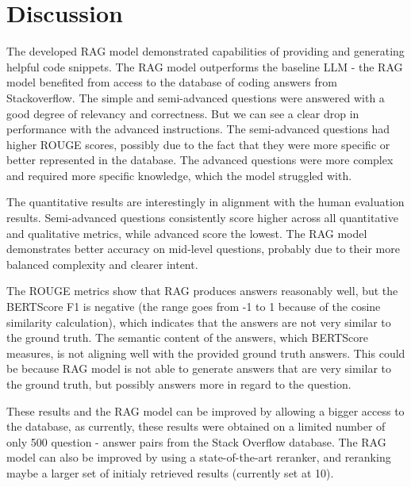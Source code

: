 \documentclass[fleqn,moreauthors,10pt]{ds_report}
\begin{document}
\section*{Discussion}
The developed RAG model demonstrated capabilities of providing and generating helpful code snippets. The RAG model outperforms the baseline LLM - the RAG model benefited from access to the database of coding answers from Stackoverflow. The simple and semi-advanced questions were answered with a good degree of relevancy and correctness. But we can see a clear drop in performance with the advanced instructions. The semi-advanced questions had higher ROUGE scores, possibly due to the fact that they were more specific or better represented in the database. The advanced questions were more complex and required more specific knowledge, which the model struggled with. 

The quantitative results are interestingly in alignment with the human evaluation results. Semi-advanced questions consistently score higher across all quantitative and qualitative metrics, while advanced score the lowest. The RAG model demonstrates better accuracy on mid-level questions, probably due to their more balanced complexity and clearer intent.

The ROUGE metrics show that RAG produces answers reasonably well, but the BERTScore F1 is negative (the range goes from -1 to 1 because of the cosine similarity calculation), which indicates that the answers are not very similar to the ground truth. The semantic content of the answers, which BERTScore measures, is not aligning well with the provided ground truth answers. This could be because RAG model is not able to generate answers that are very similar to the ground truth, but possibly answers more in regard to the question. 

These results and the RAG model can be improved by allowing a bigger access to the database, as currently, these results were obtained on a limited number of only 500 question - answer pairs from the Stack Overflow database. The RAG model can also be improved by using a state-of-the-art reranker, and reranking maybe a larger set of initialy retrieved results (currently set at 10).







\end{document}
